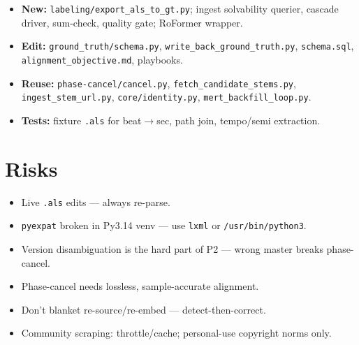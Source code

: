 \documentclass[11pt,a4paper]{article}
\begin{document}
\begin{itemize}[noitemsep]
  \item \textbf{New:} \texttt{labeling/export\_als\_to\_gt.py}; ingest solvability querier,
        cascade driver, sum-check, quality gate; RoFormer wrapper.
  \item \textbf{Edit:} \texttt{ground\_truth/schema.py}, \texttt{write\_back\_ground\_truth.py},
        \texttt{schema.sql}, \texttt{alignment\_objective.md}, playbooks.
  \item \textbf{Reuse:} \texttt{phase-cancel/cancel.py}, \texttt{fetch\_candidate\_stems.py},
        \texttt{ingest\_stem\_url.py}, \texttt{core/identity.py}, \texttt{mert\_backfill\_loop.py}.
  \item \textbf{Tests:} fixture \texttt{.als} for beat$\to$sec, path join, tempo/semi extraction.
\end{itemize}

\section{Risks}

\begin{itemize}[noitemsep]
  \item Live \texttt{.als} edits --- always re-parse.
  \item \texttt{pyexpat} broken in Py3.14 venv --- use \texttt{lxml} or \texttt{/usr/bin/python3}.
  \item Version disambiguation is the hard part of P2 --- wrong master breaks phase-cancel.
  \item Phase-cancel needs lossless, sample-accurate alignment.
  \item Don't blanket re-source/re-embed --- detect-then-correct.
  \item Community scraping: throttle/cache; personal-use copyright norms only.
\end{itemize}
\end{document}
